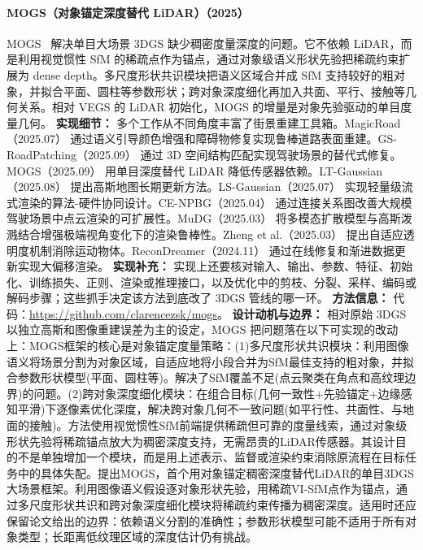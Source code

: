 \paragraph{MOGS（对象锚定深度替代 LiDAR）（2025）}
MOGS~\cite{2509_06685} 解决单目大场景 3DGS 缺少稠密度量深度的问题。它不依赖 LiDAR，而是利用视觉惯性 SfM 的稀疏点作为锚点，通过对象级语义形状先验把稀疏约束扩展为 dense depth。多尺度形状共识模块把语义区域合并成 SfM 支持较好的粗对象，并拟合平面、圆柱等参数形状；跨对象深度细化再加入共面、平行、接触等几何关系。相对 VEGS 的 LiDAR 初始化，MOGS 的增量是对象先验驱动的单目度量几何。
\textbf{实现细节：} 多个工作从不同角度丰富了街景重建工具箱。MagicRoad（2025.07） 通过语义引导颜色增强和障碍物修复实现鲁棒道路表面重建。GS-RoadPatching（2025.09） 通过 3D 空间结构匹配实现驾驶场景的替代式修复。MOGS（2025.09） 用单目深度替代 LiDAR 降低传感器依赖。LT-Gaussian（2025.08） 提出高斯地图长期更新方法。LS-Gaussian（2025.07） 实现轻量级流式渲染的算法-硬件协同设计。CE-NPBG（2025.04） 通过连接关系图改善大规模驾驶场景中点云渲染的可扩展性。MuDG（2025.03） 将多模态扩散模型与高斯泼溅结合增强极端视角变化下的渲染鲁棒性。Zheng et al.（2025.03） 提出自适应透明度机制消除运动物体。ReconDreamer（2024.11） 通过在线修复和渐进数据更新实现大偏移渲染。
\textbf{实现补充：} 实现上还要核对输入、输出、参数、特征、初始化、训练损失、正则、渲染或推理接口，以及优化中的剪枝、分裂、采样、编码或解码步骤；这些抓手决定该方法到底改了 3DGS 管线的哪一环。
\textbf{方法信息：} 代码：\url{https://github.com/clarencezsk/mogs}。
\textbf{设计动机与边界：} 相对原始 3DGS 以独立高斯和图像重建误差为主的设定，MOGS 把问题落在以下可实现的改动上：MOGS框架的核心是对象锚定度量策略：(1)多尺度形状共识模块：利用图像语义将场景分割为对象区域，自适应地将小段合并为SfM最佳支持的粗对象，并拟合参数形状模型(平面、圆柱等)。解决了SfM覆盖不足(点云聚类在角点和高纹理边界)的问题。(2)跨对象深度细化模块：在组合目标(几何一致性+先验锚定+边缘感知平滑)下逐像素优化深度，解决跨对象几何不一致问题(如平行性、共面性、与地面的接触)。方法使用视觉惯性SfM前端提供稀疏但可靠的度量线索，通过对象级形状先验将稀疏锚点放大为稠密深度支持，无需昂贵的LiDAR传感器。其设计目的不是单独增加一个模块，而是用上述表示、监督或渲染约束消除原流程在目标任务中的具体失配。提出MOGS，首个用对象锚定稠密深度替代LiDAR的单目3DGS大场景框架。利用图像语义假设逐对象形状先验，用稀疏VI-SfM点作为锚点，通过多尺度形状共识和跨对象深度细化模块将稀疏约束传播为稠密深度。适用时还应保留论文给出的边界：依赖语义分割的准确性；参数形状模型可能不适用于所有对象类型；长距离低纹理区域的深度估计仍有挑战。
